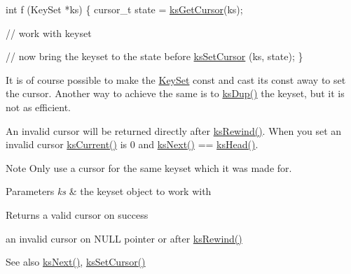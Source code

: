 \begin{DoxyCode}
\textcolor{keywordtype}{int} f (KeySet *ks)
\{
        cursor\_t state = \hyperlink{group__keyset_gaffe507ab9281c322eb16c3e992075d29}{ksGetCursor}(ks);

        \textcolor{comment}{// work with keyset}

        \textcolor{comment}{// now bring the keyset to the state before}
        \hyperlink{group__keyset_gad94c9ffaa3e8034564c0712fd407c345}{ksSetCursor} (ks, state);
\}
\end{DoxyCode}


It is of course possible to make the \hyperlink{classkdb_1_1KeySet}{Key\+Set} const and cast its const away to set the cursor. Another way to achieve the same is to \hyperlink{group__keyset_gac59e4b328245463f1451f68d5106151c}{ks\+Dup()} the keyset, but it is not as efficient.

An invalid cursor will be returned directly after \hyperlink{group__keyset_gabe793ff51f1728e3429c84a8a9086b70}{ks\+Rewind()}. When you set an invalid cursor \hyperlink{group__keyset_ga4287b9416912c5f2ab9c195cb74fb094}{ks\+Current()} is 0 and \hyperlink{group__keyset_ga317321c9065b5a4b3e33fe1c399bcec9}{ks\+Next()} == \hyperlink{group__keyset_gae7dbf3aef70e67b5328475eb3d1f92f5}{ks\+Head()}.

\begin{DoxyNote}{Note}
Only use a cursor for the same keyset which it was made for.
\end{DoxyNote}

\begin{DoxyParams}{Parameters}
{\em ks} & the keyset object to work with \\
\hline
\end{DoxyParams}
\begin{DoxyReturn}{Returns}
a valid cursor on success 

an invalid cursor on N\+U\+LL pointer or after \hyperlink{group__keyset_gabe793ff51f1728e3429c84a8a9086b70}{ks\+Rewind()} 
\end{DoxyReturn}
\begin{DoxySeeAlso}{See also}
\hyperlink{group__keyset_ga317321c9065b5a4b3e33fe1c399bcec9}{ks\+Next()}, \hyperlink{group__keyset_gad94c9ffaa3e8034564c0712fd407c345}{ks\+Set\+Cursor()} 
\end{DoxySeeAlso}
\mbox{\label{classkdb_1_1KeySet_a4e9a3906e0b18a783f8a6e8bdbec9ed0}} 
